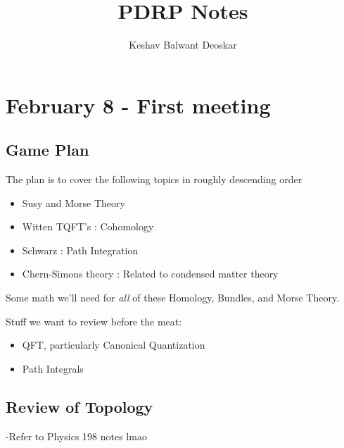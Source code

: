 \documentclass{article}
\title{PDRP Notes}
\author{Keshav Balwant Deoskar}
\begin{document}
\maketitle


\tableofcontents

\pagebreak

\section{February 8 - First meeting}

\subsection{Game Plan}
The plan is to cover the following topics in roughly descending order

\vskip 0.5cm
\begin{itemize}
  \item Susy and Morse Theory 
  \item Witten TQFT's : Cohomology
  \item Schwarz : Path Integration 
  \item Chern-Simons theory : Related to condensed matter theory
\end{itemize}

\vskip 0.5cm
Some math we'll need for \emph{all} of these Homology, Bundles, and Morse Theory.

Stuff we want to review before the meat:
\begin{itemize}
  \item QFT, particularly Canonical Quantization
  \item Path Integrals
\end{itemize}

\vskip 1cm
\subsection{Review of Topology}

-Refer to Physics 198 notes lmao
\end{document}
